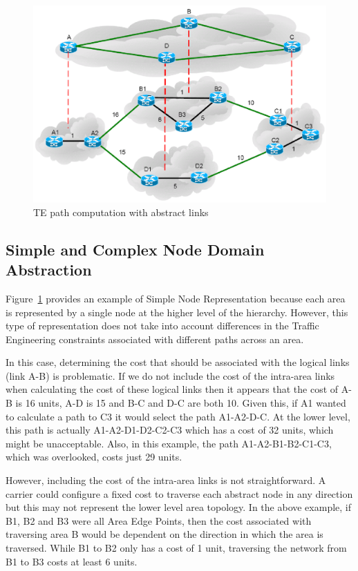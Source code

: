 \begin{figure}[t]
\centering
\includegraphics[scale=0.75]{Figures/TEVirtual.eps}
\caption{TE path computation with abstract links}
\label{fig:TEVirtual}
\end{figure}

\subsection{Simple and Complex Node Domain Abstraction}
Figure~\ref{fig:TEVirtual} provides an example of Simple Node Representation because each area is represented by a single node at the higher level of the hierarchy. However, this type of representation does not take into account differences in the Traffic Engineering constraints associated with different paths across an area.

In this case, determining the cost that should be associated with the logical links  (\eg link A-B) is problematic. If we do not include the cost of the intra-area links when calculating the cost of these logical links then it appears that the cost of A-B is 16 units, A-D is 15 and B-C and D-C are both 10. Given this, if A1 wanted to calculate a path to C3 it would select the path A1-A2-D-C. At the lower level, this path is actually A1-A2-D1-D2-C2-C3 which has a cost of 32 units, which might be unacceptable. Also, in this example, the path A1-A2-B1-B2-C1-C3, which was overlooked, costs just 29 units.

However, including the cost of the intra-area links is not straightforward. A carrier could configure a fixed cost to traverse each abstract node in any direction but this may not represent the lower level area topology. In the above example, if B1, B2 and B3 were all Area Edge Points, then the cost associated with traversing area B would be dependent on the direction in which the area is traversed. While B1 to B2 only has a cost of 1 unit, traversing the network from B1 to B3 costs at least 6 units.

